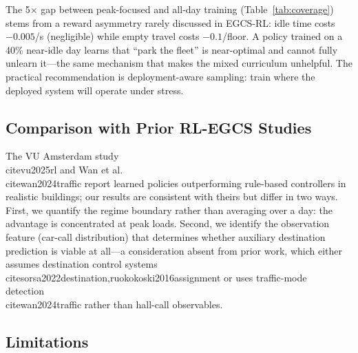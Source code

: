 \documentclass[conference]{IEEEtran}
\begin{document}
The 5$\times$ gap between peak-focused and all-day training
(Table~\ref{tab:coverage}) stems from a reward asymmetry rarely
discussed in EGCS-RL: idle time costs $-0.005$/s (negligible) while
empty travel costs $-0.1$/floor. A policy trained on a 40\%
near-idle day learns that ``park the fleet'' is near-optimal and
cannot fully unlearn it---the same mechanism that makes the mixed
curriculum unhelpful. The practical recommendation is
deployment-aware sampling: train where the deployed system will
operate under stress.

\subsection{Comparison with Prior RL-EGCS Studies}

The VU Amsterdam study~\\cite{vu2025rl} and Wan et al.~\\cite{wan2024traffic}
report learned policies outperforming rule-based controllers in
realistic buildings; our results are consistent with theirs but
differ in two ways. First, we quantify the regime boundary rather
than averaging over a day: the advantage is concentrated at peak
loads. Second, we identify the observation feature (car-call
distribution) that determines whether auxiliary destination
prediction is viable at all---a consideration absent from prior
work, which either assumes destination control
systems~\\cite{sorsa2022destination,ruokokoski2016assignment} or
uses traffic-mode detection~\\cite{wan2024traffic} rather than
hall-call observables.

\subsection{Limitations}
\end{document}
